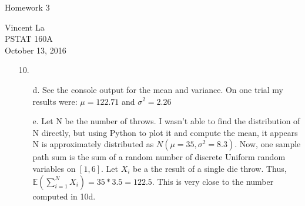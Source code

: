 \documentclass[11pt]{article}
\title{ }
\begin{document}
	\begin{center}	%
		\Large{Homework 3}	%
	\end{center}
	\begin{center}
		Vincent La \\
		PSTAT 160A \\
		October 13, 2016
	\end{center}

\begin{enumerate}

\item[10.]
	\begin{enumerate}
		\item[d.] See the console output for the mean and variance. On one trial my results were: $\mu = 122.71$ and $\sigma^2 = 2.26$
		\item[e.] Let N be the number of throws. I wasn't able to find the distribution of N directly, but using Python to plot it and compute the mean, it appears N is approximately distributed as $N(\mu = 35, \sigma^2 = 8.3)$. Now, one sample path sum is the sum of a random number of discrete Uniform random variables on $[1,6]$. Let $X_i$ be a the result of a single die throw. Thus,
		$\mathbb{E}(\sum^{N}_{i=1} X_i) = 35 * 3.5 = 122.5$. This is very close to the number computed in 10d.
		
	\end{enumerate}
\end{enumerate}
\end{document}
